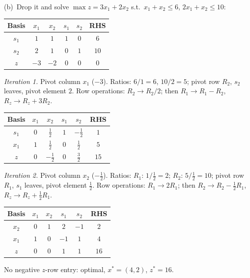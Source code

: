 \begin{solutions}
        (b)~Drop it and solve $\max z=3x_1+2x_2$ s.t.\ $x_1+x_2\le 6$,
        $2x_1+x_2\le 10$:
        \begin{center}
        \begin{tabular}{c|cccc|c}
        Basis & $x_1$ & $x_2$ & $s_1$ & $s_2$ & RHS\\
        \hline
        $s_1$ & $1$ & $1$ & $1$ & $0$ & $6$\\
        $s_2$ & $2$ & $1$ & $0$ & $1$ & $10$\\
        \hline
        $z$ & $-3$ & $-2$ & $0$ & $0$ & $0$\\
        \end{tabular}
        \end{center}
        \emph{Iteration 1.} Pivot column $x_1$ ($-3$). Ratios: $6/1=6$,
        $10/2=5$; pivot row $R_2$, $s_2$ leaves, pivot element $2$. Row
        operations: $R_2\to R_2/2$; then $R_1\to R_1-R_2$,
        $R_z\to R_z+3R_2$.
        \begin{center}
        \begin{tabular}{c|cccc|c}
        Basis & $x_1$ & $x_2$ & $s_1$ & $s_2$ & RHS\\
        \hline
        $s_1$ & $0$ & $\tfrac{1}{2}$ & $1$ & $-\tfrac{1}{2}$ & $1$\\
        $x_1$ & $1$ & $\tfrac{1}{2}$ & $0$ & $\tfrac{1}{2}$ & $5$\\
        \hline
        $z$ & $0$ & $-\tfrac{1}{2}$ & $0$ & $\tfrac{3}{2}$ & $15$\\
        \end{tabular}
        \end{center}
        \emph{Iteration 2.} Pivot column $x_2$ ($-\tfrac12$). Ratios:
        $R_1$: $1\big/\tfrac12=2$; $R_2$: $5\big/\tfrac12=10$; pivot row
        $R_1$, $s_1$ leaves, pivot element $\tfrac12$. Row operations:
        $R_1\to 2R_1$; then $R_2\to R_2-\tfrac12 R_1$,
        $R_z\to R_z+\tfrac12 R_1$.
        \begin{center}
        \begin{tabular}{c|cccc|c}
        Basis & $x_1$ & $x_2$ & $s_1$ & $s_2$ & RHS\\
        \hline
        $x_2$ & $0$ & $1$ & $2$ & $-1$ & $2$\\
        $x_1$ & $1$ & $0$ & $-1$ & $1$ & $4$\\
        \hline
        $z$ & $0$ & $0$ & $1$ & $1$ & $16$\\
        \end{tabular}
        \end{center}
        No negative $z$-row entry: optimal, $x^{*}=(4,2)$, $z^{*}=16$.


\end{solutions}
